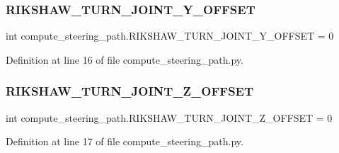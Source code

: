 \subsubsection{\texorpdfstring{RIKSHAW\_TURN\_JOINT\_Y\_OFFSET}{RIKSHAW\_TURN\_JOINT\_Y\_OFFSET}}
{\footnotesize\ttfamily int compute\+\_\+steering\+\_\+path.\+R\+I\+K\+S\+H\+A\+W\+\_\+\+T\+U\+R\+N\+\_\+\+J\+O\+I\+N\+T\+\_\+\+Y\+\_\+\+O\+F\+F\+S\+ET = 0}



Definition at line 16 of file compute\+\_\+steering\+\_\+path.\+py.

\mbox{\label{namespacecompute__steering__path_aa57a41d7e87ace0fb1989333822c4a5c}} 
\subsubsection{\texorpdfstring{RIKSHAW\_TURN\_JOINT\_Z\_OFFSET}{RIKSHAW\_TURN\_JOINT\_Z\_OFFSET}}
{\footnotesize\ttfamily int compute\+\_\+steering\+\_\+path.\+R\+I\+K\+S\+H\+A\+W\+\_\+\+T\+U\+R\+N\+\_\+\+J\+O\+I\+N\+T\+\_\+\+Z\+\_\+\+O\+F\+F\+S\+ET = 0}



Definition at line 17 of file compute\+\_\+steering\+\_\+path.\+py.

